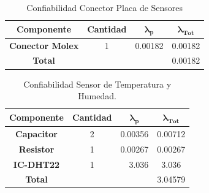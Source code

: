 \begin{table}[H]
\centering
\begin{tabular}{|c|clc|}
\hline
\textbf{Componente}     & \multicolumn{1}{c|}{\textbf{Cantidad}} & \multicolumn{1}{c|}{$\boldsymbol{\lambda_p}$} & $\boldsymbol{\lambda_{Tot}}$  \\ \hline
\textbf{Conector Molex} & \multicolumn{1}{c|}{1}                 & \multicolumn{1}{r|}{0.00182}              & 0.00182                      \\ \hline
\textbf{Total}          & \multicolumn{1}{l}{}                   &                                           & \multicolumn{1}{r|}{0.00182} \\ \hline
\end{tabular}
\caption{Confiabilidad Conector Placa de Sensores}
\label{confsensores}
\end{table}
\begin{table}[H]
\centering
\begin{tabular}{|c|crc|}
\hline
\textbf{Componente}         & \multicolumn{1}{c|}{\textbf{Cantidad}} & \multicolumn{1}{c|}{$\boldsymbol{\lambda_p}$}        & $\boldsymbol{\lambda_{Tot}}$ \\ \hline
\textbf{Capacitor} & \multicolumn{1}{c|}{2}                 & \multicolumn{1}{r|}{0.00356}                         & 0.00712                      \\ \hline
\textbf{Resistor}  & \multicolumn{1}{c|}{1}                 & \multicolumn{1}{r|}{\cellcolor[HTML]{FFFFFF}0.00267} & 0.00267                      \\ \hline
\textbf{IC-DHT22}  & \multicolumn{1}{c|}{1}                 & \multicolumn{1}{r|}{3.036}                           & 3.036                        \\ \hline
\textbf{Total}     & \multicolumn{1}{l}{}                   & \multicolumn{1}{l}{}                                 & \multicolumn{1}{r|}{3.04579} \\ \hline
\end{tabular}
\caption{Confiabilidad Sensor de Temperatura y Humedad.}
\label{tab:conftemphum}
\end{table}

